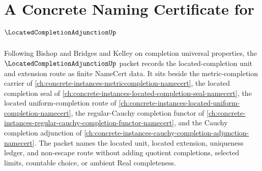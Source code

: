 \chapter{A Concrete Naming Certificate for $\LocatedCompletionAdjunctionUp$}
\label{ch:concrete-instances-located-completion-adjunction-namecert}

Following Bishop and Bridges and Kelley on completion universal properties, the $\LocatedCompletionAdjunctionUp$ packet records the located-completion unit and extension route as finite NameCert data. It sits beside the metric-completion carrier of \autoref{ch:concrete-instances-metriccompletion-namecert}, the located completion seal of \autoref{ch:concrete-instances-located-completion-seal-namecert}, the located uniform-completion route of \autoref{ch:concrete-instances-located-uniform-completion-namecert}, the regular-Cauchy completion functor of \autoref{ch:concrete-instances-regular-cauchy-completion-functor-namecert}, and the Cauchy completion adjunction of \autoref{ch:concrete-instances-cauchy-completion-adjunction-namecert}. The packet names the located unit, located extension, uniqueness ledger, and non-escape route without adding quotient completions, selected limits, countable choice, or ambient Real completeness.

